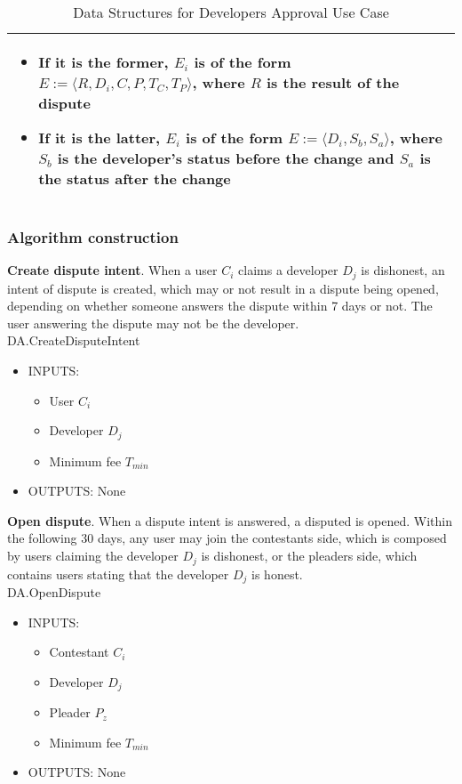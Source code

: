 \begin{table}[H]
\begin{tabular}{|p{}|}
\begin{itemize}
\begin{itemize}
		\begin{itemize}
			\item If it is the former, $E_i$ is of the form $E := \langle R, D_i, C, P, T_C, T_P\rangle$, where $R$ is the result of the dispute
			\item If it is the latter, $E_i$ is of the form $E := \langle D_i, S_b, S_a\rangle$, where $S_b$ is the developer's status before the change and $S_a$ is the status after the change
		\end{itemize}
	\end{itemize}
\end{itemize} \\
\hline
\end{tabular}
\caption{Data Structures for Developers Approval Use Case}
\label{table: data_structures_da}
\end{table}

\subsubsection{Algorithm construction}

\noindent \textbf{Create dispute intent}. When a user $C_i$ claims a developer $D_j$ is dishonest, an intent of dispute is created, which may or not result in a dispute being opened, depending on whether someone answers the dispute within 7 days or not. The user answering the dispute may not be the developer. \\

\textsf{DA.CreateDisputeIntent}
\begin{itemize}
	\item INPUTS:
	\begin{itemize}
		\item User $C_i$
		\item Developer $D_j$
		\item Minimum fee $T_{min}$
	\end{itemize}
	\item OUTPUTS: None
\end{itemize}

\noindent \textbf{Open dispute}. When a dispute intent is answered, a disputed is opened. Within the following 30 days, any user may join the contestants side, which is composed by users claiming the developer $D_j$ is dishonest, or the pleaders side, which contains users stating that the developer $D_j$ is honest. \\

\textsf{DA.OpenDispute}
\begin{itemize}
	\item INPUTS:
	\begin{itemize}
		\item Contestant $C_i$
		\item Developer $D_j$
		\item Pleader $P_z$
		\item Minimum fee $T_{min}$
	\end{itemize}
	\item OUTPUTS: None
\end{itemize}

